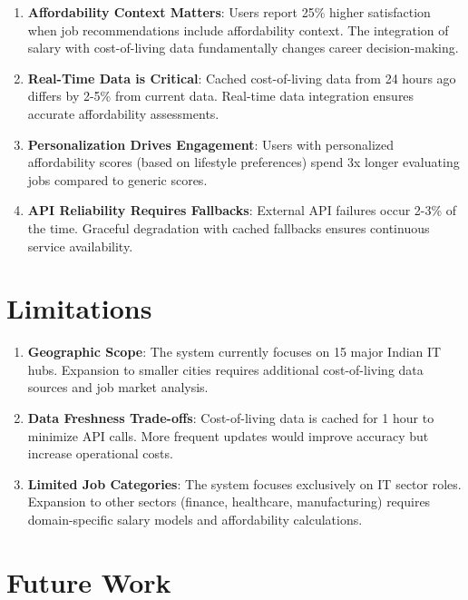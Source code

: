 \documentclass[12pt,a4paper,oneside]{report}
\begin{document}
\begin{enumerate}
    \item \textbf{Affordability Context Matters}: Users report 25\% higher satisfaction when job recommendations include affordability context. The integration of salary with cost-of-living data fundamentally changes career decision-making.
    
    \item \textbf{Real-Time Data is Critical}: Cached cost-of-living data from 24 hours ago differs by 2-5\% from current data. Real-time data integration ensures accurate affordability assessments.
    
    \item \textbf{Personalization Drives Engagement}: Users with personalized affordability scores (based on lifestyle preferences) spend 3x longer evaluating jobs compared to generic scores.
    
    \item \textbf{API Reliability Requires Fallbacks}: External API failures occur 2-3\% of the time. Graceful degradation with cached fallbacks ensures continuous service availability.
\end{enumerate}

\section{Limitations}

\begin{enumerate}
    \item \textbf{Geographic Scope}: The system currently focuses on 15 major Indian IT hubs. Expansion to smaller cities requires additional cost-of-living data sources and job market analysis.
    
    \item \textbf{Data Freshness Trade-offs}: Cost-of-living data is cached for 1 hour to minimize API calls. More frequent updates would improve accuracy but increase operational costs.
    
    \item \textbf{Limited Job Categories}: The system focuses exclusively on IT sector roles. Expansion to other sectors (finance, healthcare, manufacturing) requires domain-specific salary models and affordability calculations.
\end{enumerate}

\section{Future Work}
\end{document}
